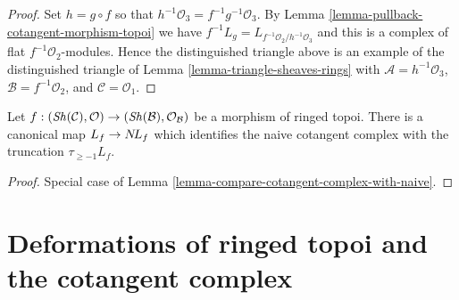 \begin{proof}
Set $h = g \circ f$ so that $h^{-1}\mathcal{O}_3 = f^{-1}g^{-1}\mathcal{O}_3$.
By Lemma \ref{lemma-pullback-cotangent-morphism-topoi} we have
$f^{-1}L_g = L_{f^{-1}\mathcal{O}_2/h^{-1}\mathcal{O}_3}$
and this is a complex of flat $f^{-1}\mathcal{O}_2$-modules.
Hence the distinguished triangle above is an example of the
distinguished triangle of
Lemma \ref{lemma-triangle-sheaves-rings}
with $\mathcal{A} = h^{-1}\mathcal{O}_3$, $\mathcal{B} = f^{-1}\mathcal{O}_2$,
and $\mathcal{C} = \mathcal{O}_1$.
\end{proof}

\begin{lemma}
\label{lemma-compare-cotangent-complex-with-naive-ringed-topoi}
Let $f : (\mathop{\mathit{Sh}}\nolimits(\mathcal{C}), \mathcal{O}) \to
(\mathop{\mathit{Sh}}\nolimits(\mathcal{B}), \mathcal{O}_\mathcal{B})$ be a morphism of
ringed topoi. There is a canonical map $L_f \to \mathop{N\!L}\nolimits_f$ which
identifies the naive cotangent complex with the truncation
$\tau_{\geq -1}L_f$.
\end{lemma}

\begin{proof}
Special case of Lemma \ref{lemma-compare-cotangent-complex-with-naive}.
\end{proof}








\section{Deformations of ringed topoi and the cotangent complex}
\label{section-deformations-ringed-topoi}

